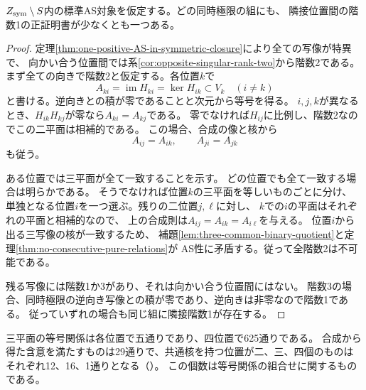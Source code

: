 \begin{theorem}[対称閉包のAS残余に必要な隣接階数1]\label{thm:singular-transfer-rank-one-required}
$Z_{\rm sym}\setminus S$内の標準AS対象を仮定する。どの同時極限の組にも、
隣接位置間の階数1の正証明書が少なくとも一つある。
\end{theorem}
\begin{proof}
定理\ref{thm:one-positive-AS-in-symmetric-closure}により全ての写像が特異で、
向かい合う位置間では系\ref{cor:opposite-singular-rank-two}から階数2である。
まず全ての向きで階数2と仮定する。各位置$k$で
\[
 A_{ki}=\operatorname{im} H_{ki}=\ker H_{ik}\subset V_k\quad(i\ne k)
\]
と書ける。逆向きとの積が零であることと次元から等号を得る。
$i,j,k$が異なるとき、$H_{ik}H_{kj}$が零なら$A_{ki}=A_{kj}$である。
零でなければ$H_{ij}$に比例し、階数2なのでこの二平面は相補的である。
この場合、合成の像と核から
\[
 A_{ij}=A_{ik},\qquad A_{ji}=A_{jk}
\]
も従う。

ある位置では三平面が全て一致することを示す。
どの位置でも全て一致する場合は明らかである。
そうでなければ位置$k$の三平面を等しいものごとに分け、
単独となる位置$i$を一つ選ぶ。残りの二位置$j,\ell$に対し、
$k$での$i$の平面はそれぞれの平面と相補的なので、
上の合成則は$A_{ij}=A_{ik}=A_{i\ell}$を与える。
位置$i$から出る三写像の核が一致するため、
補題\ref{lem:three-common-binary-quotient}と定理\ref{thm:no-consecutive-pure-relations}が
AS性に矛盾する。従って全階数2は不可能である。

残る写像には階数1か3があり、それは向かい合う位置間にはない。
階数3の場合、同時極限の逆向き写像との積が零であり、逆向きは非零なので階数1である。
従っていずれの場合も同じ組に隣接階数1が存在する。
\end{proof}

三平面の等号関係は各位置で五通りであり、四位置で625通りである。
合成から得た含意を満たすものは29通りで、共通核を持つ位置が二、三、四個のものは
それぞれ12、16、1通りとなる（）。
この個数は等号関係の組合せに関するものである。

